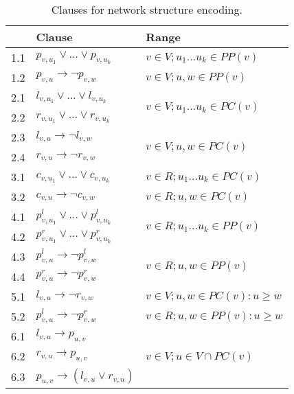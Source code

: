 \documentclass[runningheads, envcountsame, a4paper]{llncs}
\begin{document}
\begin{table}[t]
\centering
\caption{Clauses for network structure encoding.}
\begin{tabular}{l | l | l}
  \qquad & Clause & Range \\
  
  \hline
  1.1 &
  $p_{v,u_1} \vee \dots \vee p_{v,u_k}$ &
  $v \in V; u_1 \dots u_k \in PP(v)$
  \\
  1.2 &
  $p_{v,u} \rightarrow \neg p_{v,w}$ &
  $v \in V; u, w \in PP(v)$
  \\
  
  \hline
  2.1 &
  $l_{v,u_1} \vee \dots \vee l_{v,u_k}$ &
  \multirow{2}{*}{$v \in V; u_1 \dots u_k \in PC(v)$}
  \\
  2.2 &
  $r_{v,u_1} \vee \dots \vee r_{v,u_k}$ &
  \\
  \hdashline
  
  2.3 &
  $l_{v,u} \rightarrow \neg l_{v,w}$ &
  \multirow{2}{*}{$v \in V; u, w \in PC(v)$}
  \\
  2.4 &
  $r_{v,u} \rightarrow \neg r_{v,w}$ &
  \\
  
  \hline
  3.1 &
  $c_{v,u_1} \vee \dots \vee c_{v,u_k}$ &
  $v \in R; u_1 \dots u_k \in PC(v)$
  \\
  3.2 &
  $c_{v,u} \rightarrow \neg c_{v,w}$ &
  $v \in R; u, w \in PC(v)$
  \\
  
  \hline
  4.1 &
  $p^l_{v,u_1} \vee \dots \vee p^l_{v,u_k}$ &
  \multirow{2}{*}{$v \in R; u_1 \dots u_k \in PP(v)$}
  \\
  4.2 &
  $p^r_{v,u_1} \vee \dots \vee p^r_{v,u_k}$ &
  \\
  \hdashline
  
  4.3 &
  $p^l_{v,u} \rightarrow \neg p^l_{v,w}$ &
  \multirow{2}{*}{$v \in R; u, w \in PP(v)$}
  \\
  4.4 &
  $p^r_{v,u} \rightarrow \neg p^r_{v,w}$ &
  \\

  \hline
  5.1 &
  $l_{v,u} \rightarrow \neg r_{v,w}$ &
  $v \in V; u, w \in PC(v): u \geq w$
  \\
  5.2 &
  $p^l_{v,u} \rightarrow \neg p^r_{v,w}$ &
  $v \in R; u, w \in PP(v) : u \geq w$
  \\
  
  \hline
  6.1 &
  $l_{v,u} \rightarrow p_{u,v}$ &
  \multirow{3}{*}{$v \in V; u \in V \cap PC(v)$}
  \\
  6.2 &
  $r_{v,u} \rightarrow p_{u,v}$ &
  \\
  6.3 &
  $p_{u,v} \rightarrow (l_{v,u} \vee r_{v,u})$ &
  \\
  

\end{tabular}
\end{table}
\end{document}
